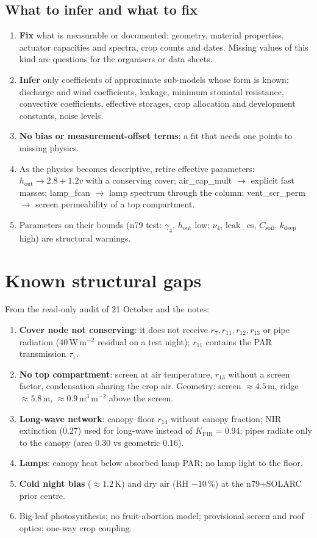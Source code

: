 \documentclass[11pt,a4paper]{article}
\begin{document}
\subsection{What to infer and what to fix}
\begin{enumerate}[nosep]
\item \textbf{Fix} what is measurable or documented: geometry, material properties, actuator capacities and
spectra, crop counts and dates. Missing values of this kind are questions for the organisers or data sheets.
\item \textbf{Infer} only coefficients of approximate sub-models whose form is known: discharge and wind
coefficients, leakage, minimum stomatal resistance, convective coefficients, effective storages, crop
allocation and development constants, noise levels.
\item \textbf{No bias or measurement-offset terms}; a fit that needs one points to missing physics.
\item As the physics becomes descriptive, retire effective parameters: $h_{\text{out}}\to2.8+1.2v$ with a
conserving cover; air\_cap\_mult $\to$ explicit fast masses; lamp\_fcan $\to$ lamp spectrum through the column;
vent\_scr\_perm $\to$ screen permeability of a top compartment.
\item Parameters on their bounds (n79 test: $\gamma_4$, $h_{\text{out}}$ low; $\nu_4$, leak\_cs, $C_{\text{soil}}$,
$k_{\text{deep}}$ high) are structural warnings.
\end{enumerate}

\section{Known structural gaps}\label{sec:gaps}
From the read-only audit of 21 October and the notes:
\begin{enumerate}[nosep]
\item \textbf{Cover node not conserving}: it does not receive $r_7,r_{11},r_{12},r_{13}$ or pipe radiation
(40\,W\,m$^{-2}$ residual on a test night); $r_{11}$ contains the PAR transmission $\tau_1$.
\item \textbf{No top compartment}: screen at air temperature, $r_{13}$ without a screen factor, condensation
sharing the crop air. Geometry: screen $\approx4.5$\,m, ridge $\approx5.8$\,m, $\approx0.9$\,m$^3$\,m$^{-2}$ above the screen.
\item \textbf{Long-wave network}: canopy--floor $r_{14}$ without canopy fraction; NIR extinction (0.27) used for
long-wave instead of $K_{\text{FIR}}=0.94$; pipes radiate only to the canopy (area 0.30 vs geometric 0.16).
\item \textbf{Lamps}: canopy heat below absorbed lamp PAR; no lamp light to the floor.
\item \textbf{Cold night bias} ($\approx1.2$\,K) and dry air (RH $-10\,\%$) at the n79+SOLARC prior centre.
\item Big-leaf photosynthesis; no fruit-abortion model; provisional screen and roof optics; one-way crop coupling.
\end{enumerate}
\end{document}
